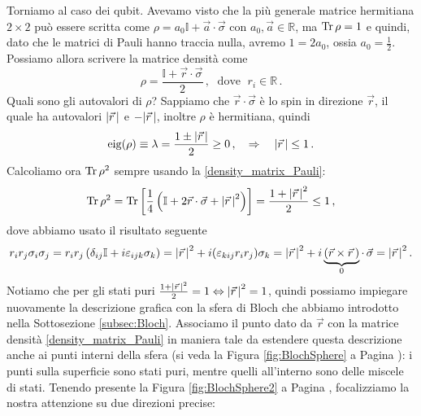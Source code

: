 \noindent Torniamo al caso dei qubit. Avevamo visto che la più generale matrice hermitiana $2 \times 2$ può essere scritta come $\rho = a_0 \mathbb{I} + \vec{a} \cdot \vec{\sigma}$ con $a_0, \vec{a} \in \mathbb{R}$, ma $\Tr \rho = 1$ e quindi, dato che le matrici di Pauli hanno traccia nulla, avremo $1 = 2 a_0$, ossia $a_0 = \frac{1}{2}$. Possiamo allora scrivere la matrice densità come
\begin{equation}\label{density_matrix_Pauli}
    \rho = \frac{\mathbb{I} + \vec{r} \cdot \vec{\sigma}}{2} \, , \; \text{ dove } \; r_i \in \mathbb{R} \, .
\end{equation}
Quali sono gli autovalori di $\rho$? Sappiamo che $\vec{r} \cdot \vec{\sigma}$ è lo spin in direzione $\vec{r}$, il quale ha autovalori $\abs{\vec{r}\,}$ e $-\abs{\vec{r}\,}$, inoltre $\rho$ è hermitiana, quindi
\begin{equation*}
    \operatorname{eig}(\rho) \equiv \lambda = \frac{1 \pm \abs{\vec{r} \,}}{2} \geq 0 \, , \quad \Rightarrow \quad \abs{\vec{r}\,} \leq 1 \, . 
\end{equation*}
Calcoliamo ora $\Tr \rho^2$ sempre usando la \eqref{density_matrix_Pauli}:
\begin{equation*}
    \Tr \rho^2 = \Tr \left[ \frac{1}{4} \left( \mathbb{I} + 2 \vec{r} \cdot \vec{\sigma} + \abs{\vec{r}\,}^2 \right) \right] = \frac{1 + \abs{\vec{r}\,}^2}{2} \leq 1 \, ,
\end{equation*}
dove abbiamo usato il risultato seguente
\begin{equation*}
    r_i r_j \sigma_i \sigma_j = r_i r_j \left( \delta_{ij} \mathbb{I} + i \varepsilon_{ijk} \sigma_k \right) = \abs{\vec{r}\,}^2 + i (\varepsilon_{kij} r_i r_j) \sigma_k = \abs{\vec{r}\,}^2 + i \underbrace{(\vec{r} \times \vec{r}\,)}_0 \cdot \, \vec{\sigma} = \abs{\vec{r}\,}^2 \, .
\end{equation*}
Notiamo che per gli stati puri $\frac{1+ \abs{\vec{r}\,}^2}{2} = 1 \Leftrightarrow \abs{\vec{r}\,}^2 = 1$, quindi possiamo impiegare nuovamente la descrizione grafica con la sfera di Bloch che abbiamo introdotto nella Sottosezione \ref{subsec:Bloch}. Associamo il punto dato da $\vec{r}$ con la matrice densità \eqref{density_matrix_Pauli} in maniera tale da estendere questa descrizione anche ai punti interni della sfera (si veda la Figura \ref{fig:BlochSphere} a Pagina \pageref{fig:BlochSphere}): i punti sulla superficie sono stati puri, mentre quelli all'interno sono delle miscele di stati. Tenendo presente la Figura \ref{fig:BlochSphere2} a Pagina \pageref{fig:BlochSphere2}, focalizziamo la nostra attenzione su due direzioni precise:
